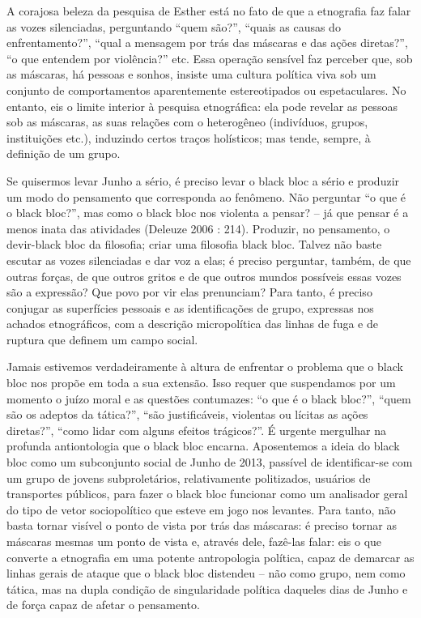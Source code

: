 A corajosa beleza da pesquisa de Esther está no fato de que a etnografia
faz falar as vozes silenciadas, perguntando ``quem são?'', ``quais as
causas do enfrentamento?'', ``qual a mensagem por trás das máscaras e
das ações diretas?'', ``o que entendem por violência?'' etc. Essa
operação sensível faz perceber que, sob as máscaras, há pessoas e
sonhos, insiste uma cultura política viva sob um conjunto de
comportamentos aparentemente estereotipados ou espetaculares. No
entanto, eis o limite interior à pesquisa etnográfica: ela pode revelar
as pessoas sob as máscaras, as suas relações com o heterogêneo
(indivíduos, grupos, instituições etc.), induzindo certos traços
holísticos; mas tende, sempre, à definição de um grupo.

Se quisermos levar Junho a sério, é preciso levar o black bloc a sério e
produzir um modo do pensamento que corresponda ao fenômeno. Não
perguntar ``o que é o black bloc?'', mas como o black bloc nos violenta
a pensar? -- já que pensar é a menos inata das atividades (Deleuze 2006
: 214). Produzir, no pensamento, o devir-black bloc da filosofia; criar
uma filosofia black bloc. Talvez não baste escutar as vozes silenciadas
e dar voz a elas; é preciso perguntar, também, de que outras forças, de
que outros gritos e de que outros mundos possíveis essas vozes são a
expressão? Que povo por vir elas prenunciam? Para tanto, é preciso
conjugar as superfícies pessoais e as identificações de grupo, expressas
nos achados etnográficos, com a descrição micropolítica das linhas de
fuga e de ruptura que definem um campo social.

Jamais estivemos verdadeiramente à altura de enfrentar o problema que o
black bloc nos propõe em toda a sua extensão. Isso requer que
suspendamos por um momento o juízo moral e as questões contumazes: ``o
que é o black bloc?'', ``quem são os adeptos da tática?'', ``são
justificáveis, violentas ou lícitas as ações diretas?'', ``como lidar
com alguns efeitos trágicos?''. É urgente mergulhar na profunda
antiontologia que o black bloc encarna. Aposentemos a ideia do black
bloc como um subconjunto social de Junho de 2013, passível de
identificar-se com um grupo de jovens subproletários, relativamente
politizados, usuários de transportes públicos, para fazer o black bloc
funcionar como um analisador geral do tipo de vetor sociopolítico que
esteve em jogo nos levantes. Para tanto, não basta tornar visível o
ponto de vista por trás das máscaras: é preciso tornar as máscaras
mesmas um ponto de vista e, através dele, fazê-las falar: eis o que
converte a etnografia em uma potente antropologia política, capaz de
demarcar as linhas gerais de ataque que o black bloc distendeu -- não
como grupo, nem como tática, mas na dupla condição de singularidade
política daqueles dias de Junho e de força capaz de afetar o pensamento.

